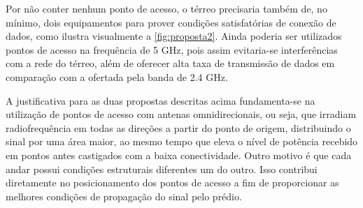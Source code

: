 \begin{figure}[H]
	\centering
\end{figure}

Por não conter nenhum ponto de acesso, o térreo precisaria também de, no mínimo, dois equipamentos para prover condições satisfatórias de conexão de dados, como ilustra visualmente a  \autoref{fig:proposta2}. Ainda poderia ser utilizados pontos de acesso na frequência de 5 GHz, pois assim evitaria-se interferências com a rede do térreo, além de oferecer alta taxa de transmissão de dados em comparação com a ofertada pela banda de 2.4 GHz.

\begin{figure}[H]
	\centering
\end{figure}

A justificativa para as duas propostas descritas acima fundamenta-se na utilização de pontos de acesso com antenas omnidirecionais, ou seja, que irradiam radiofrequência em todas as direções a partir do ponto de origem, distribuindo o sinal por uma área maior, ao mesmo tempo que eleva o nível de potência recebido em pontos antes castigados com a baixa conectividade. Outro motivo é que cada andar possui condições estruturais diferentes um do outro. Isso contribui diretamente no posicionamento dos pontos de acesso a fim de proporcionar as melhores condições de propagação do sinal pelo prédio.